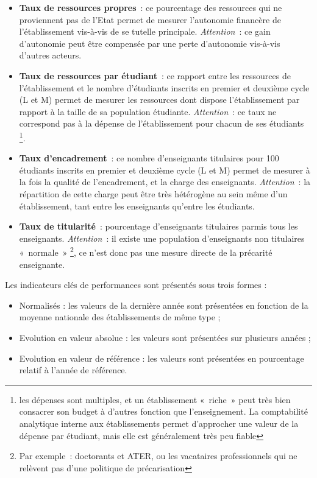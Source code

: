 \documentclass[11pt,french,landscape]{article}
\providecommand{\tightlist}{%
  \setlength{\itemsep}{0pt}\setlength{\parskip}{0pt}}
\begin{document}
\begin{multicols}{2}
\begin{itemize}
\tightlist
\item
  \textbf{Taux de ressources propres}~: ce pourcentage des ressources
  qui ne proviennent pas de l'Etat permet de mesurer l'autonomie
  financère de l'établissement vis-à-vis de se tutelle principale.
  \emph{Attention}~: ce gain d'autonomie peut être compensée par une
  perte d'autonomie vis-à-vis d'autres acteurs.
\item
  \textbf{Taux de ressources par étudiant}~: ce rapport entre les
  ressources de l'établissement et le nombre d'étudiants inscrits en
  premier et deuxième cycle (L et M) permet de mesurer les ressources
  dont dispose l'établissement par rapport à la taille de sa population
  étudiante. \emph{Attention}~: ce taux ne correspond pas à la dépense
  de l'établissement pour chacun de ses étudiants \footnote{les dépenses
    sont multiples, et un établissement «~riche~» peut très bien
    consacrer son budget à d'autres fonction que l'enseignement. La
    comptabilité analytique interne aux établissements permet
    d'approcher une valeur de la dépense par étudiant, mais elle est
    généralement très peu fiable}.
\item
  \textbf{Taux d'encadrement}~: ce nombre d'enseignants titulaires pour
  100 étudiants inscrits en premier et deuxième cycle (L et M) permet de
  mesurer à la fois la qualité de l'encadrement, et la charge des
  enseignants. \emph{Attention}~: la répartition de cette charge peut
  être très hétérogène au sein même d'un établissement, tant entre les
  enseignants qu'entre les étudiants.
\item
  \textbf{Taux de titularité}~: pourcentage d'enseignants titulaires
  parmis tous les enseignants. \emph{Attention}~: il existe une
  population d'enseignants non titulaires «~normale~» \footnote{Par
    exemple~: doctorants et ATER, ou les vacataires professionnels qui
    ne relèvent pas d'une politique de précarisation}, ce n'est donc pas
  une mesure directe de la précarité enseignante.
\end{itemize}

Les indicateurs clés de performances sont présentés sous trois formes :

\begin{itemize}
\tightlist
\item
  Normalisés : les valeurs de la dernière année sont présentées en
  fonction de la moyenne nationale des établissements de même type ;
\item
  Evolution en valeur absolue : les valeurs sont présentées sur
  plusieurs années ;
\item
  Evolution en valeur de référence : les valeurs sont présentées en
  pourcentage relatif à l'année de référence.
\end{itemize}


\end{multicols}
\end{document}
